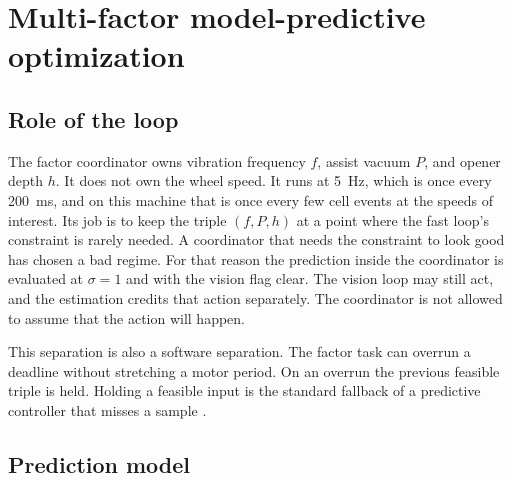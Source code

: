 \section{Multi-factor model-predictive optimization}
\label{sec:mpcdesign}

\subsection{Role of the loop}

The factor coordinator owns vibration frequency $f$, assist vacuum $P$, and opener depth $h$. It does not own the wheel speed. It runs at 5~Hz, which is once every 200~ms, and on this machine that is once every few cell events at the speeds of interest. Its job is to keep the triple $(f,P,h)$ at a point where the fast loop's constraint is rarely needed. A coordinator that needs the constraint to look good has chosen a bad regime. For that reason the prediction inside the coordinator is evaluated at $\sigma=1$ and with the vision flag clear. The vision loop may still act, and the estimation credits that action separately. The coordinator is not allowed to assume that the action will happen.

This separation is also a software separation. The factor task can overrun a deadline without stretching a motor period. On an overrun the previous feasible triple is held. Holding a feasible input is the standard fallback of a predictive controller that misses a sample \cite{maciejowski2002,rawlings2017}.

\subsection{Prediction model}
\label{sec:predmodel}

